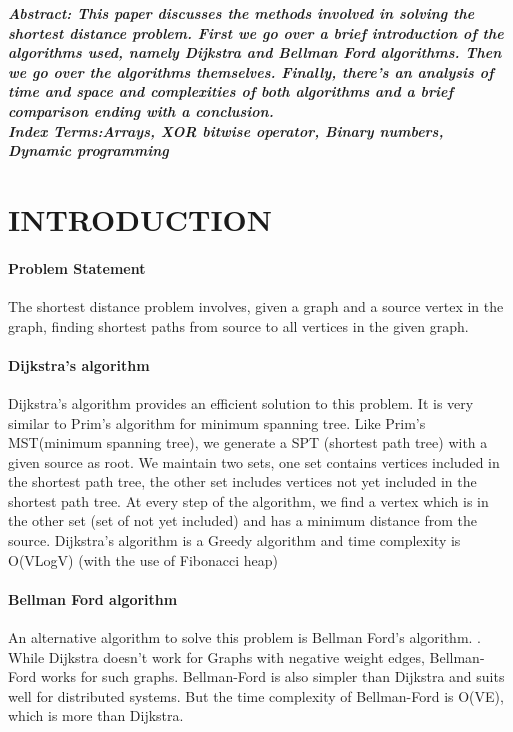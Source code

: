 \documentclass[10pt]{article}
\begin{document}
\begin{multicols*}{2}

    \textbf{\emph{{Abstract}:  This paper discusses the methods involved  in solving the shortest distance problem.  First we go over a brief introduction of the  algorithms used, namely Dijkstra and  
Bellman Ford algorithms. Then we go  
over the algorithms themselves. Finally,  there’s an analysis of time and space and  complexities of both algorithms and a  
brief comparison ending with a  
conclusion. }}\\
	
	\textbf{\emph{{Index Terms}:Arrays, XOR bitwise operator, Binary numbers, Dynamic programming\\
	}}


\section*{INTRODUCTION}

\paragraph{Problem Statement}

The shortest distance problem involves,  given a graph and a source vertex in the  graph, finding shortest paths from source  to all vertices in the given graph. 
\paragraph{Dijkstra's algorithm}
Dijkstra’s algorithm provides an efficient  solution to this problem. It is very similar  to Prim’s algorithm for minimum  
spanning tree. Like Prim’s MST(minimum  spanning tree), we generate a SPT  
(shortest path tree) with a given source as  root. We maintain two sets, one set  
contains vertices included in the shortest  path tree, the other set includes vertices  not yet included in the shortest path tree.  At every step of the algorithm, we find a  
vertex which is in the other set (set of not  yet included) and has a minimum distance  from the source. 
Dijkstra’s algorithm is a Greedy algorithm  and time complexity is O(VLogV) (with  the use of Fibonacci heap) 

\paragraph{Bellman Ford algorithm}
An alternative algorithm to solve this  problem is Bellman Ford’s algorithm. .  While Dijkstra doesn’t work for Graphs  with negative weight edges, Bellman-Ford  works for such graphs. Bellman-Ford is  also simpler than Dijkstra and suits well  for distributed systems. But the time  complexity of Bellman-Ford is O(VE),  which is more than Dijkstra.


\end{multicols*}
\end{document}
